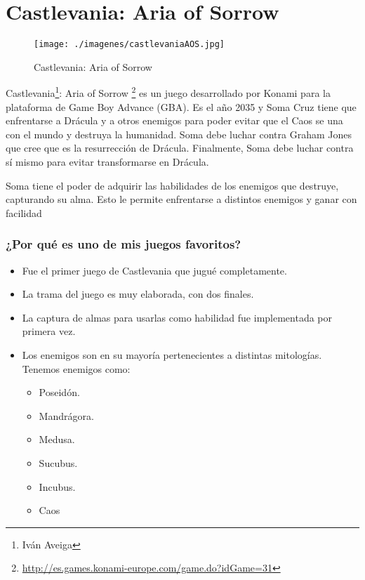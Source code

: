 \section{Castlevania: Aria of Sorrow}

\begin{figure}[htbp]
\begin{center}
\texttt{[image: ./imagenes/castlevaniaAOS.jpg]}
\caption{Castlevania: Aria of Sorrow}
\label{Zelda: Skyward Sword}
\end{center}
\end{figure}
Castlevania\footnote{Iván Aveiga}: Aria of Sorrow \footnote{\url{http://es.games.konami-europe.com/game.do?idGame=31}} es un juego desarrollado por Konami para la plataforma de Game Boy Advance (GBA). Es el año 2035 y Soma Cruz tiene que enfrentarse a Drácula y a otros enemigos para poder evitar que el Caos se una con el mundo y destruya la humanidad. Soma debe luchar contra Graham Jones que cree que es la resurrección de Drácula. Finalmente, Soma debe luchar contra sí mismo para evitar transformarse en Drácula.

Soma tiene el poder de adquirir las habilidades de los enemigos que destruye, capturando su alma. Esto le permite enfrentarse a distintos enemigos y ganar con facilidad

\subsubsection{¿Por qué es uno de mis juegos favoritos?}
\begin{itemize}
	\item Fue el primer juego de Castlevania que jugué completamente.
	\item La trama del juego es muy elaborada, con dos finales.
	\item La captura de almas para usarlas como habilidad fue implementada por primera vez.
	\item Los enemigos son en su mayoría pertenecientes a distintas mitologías. Tenemos enemigos como:
		\begin{itemize}
			\item Poseidón.
			\item Mandrágora.
			\item Medusa.
			\item Sucubus.
			\item Incubus.
			\item Caos
		\end{itemize}	
\end{itemize}